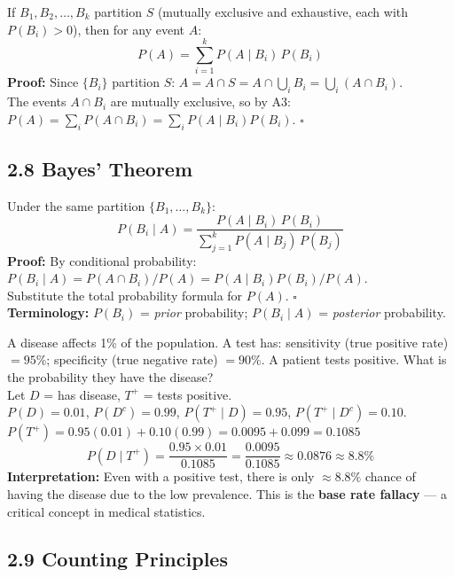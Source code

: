 \documentclass[12pt]{article}
\begin{document}
\begin{thmbox}
If $B_1,B_2,\ldots,B_k$ partition $S$ (mutually exclusive and exhaustive, each with $P(B_i)>0$), then for any event $A$:
\[P(A) = \sum_{i=1}^k P(A\mid B_i)\,P(B_i)\]
\textbf{Proof:} Since $\{B_i\}$ partition $S$: $A=A\cap S=A\cap\bigcup_i B_i=\bigcup_i(A\cap B_i)$.\\
The events $A\cap B_i$ are mutually exclusive, so by A3:
$P(A)=\sum_i P(A\cap B_i)=\sum_i P(A\mid B_i)P(B_i)$. \hfill$\square$
\end{thmbox}

\subsection{2.8 Bayes' Theorem}

\begin{thmbox}
Under the same partition $\{B_1,\ldots,B_k\}$:
\[P(B_i\mid A) = \frac{P(A\mid B_i)\,P(B_i)}{\displaystyle\sum_{j=1}^k P(A\mid B_j)\,P(B_j)}\]
\textbf{Proof:} By conditional probability: $P(B_i\mid A)=P(A\cap B_i)/P(A)=P(A\mid B_i)P(B_i)/P(A)$.\\
Substitute the total probability formula for $P(A)$. \hfill$\square$\\[4pt]
\textbf{Terminology:} $P(B_i)$ = \textit{prior} probability; $P(B_i\mid A)$ = \textit{posterior} probability.
\end{thmbox}

\begin{examplebox}
A disease affects 1\% of the population. A test has: sensitivity (true positive rate) $=95\%$; specificity (true negative rate) $=90\%$. A patient tests positive. What is the probability they have the disease?\\[6pt]
Let $D$ = has disease, $T^+$ = tests positive.\\
$P(D)=0.01$, $P(D^c)=0.99$, $P(T^+\mid D)=0.95$, $P(T^+\mid D^c)=0.10$.\\[4pt]
$P(T^+)=0.95(0.01)+0.10(0.99)=0.0095+0.099=0.1085$
\[P(D\mid T^+)=\frac{0.95\times0.01}{0.1085}=\frac{0.0095}{0.1085}\approx\mathbf{0.0876}\approx8.8\%\]
\textbf{Interpretation:} Even with a positive test, there is only $\approx8.8\%$ chance of having the disease due to the low prevalence. This is the \textbf{base rate fallacy} --- a critical concept in medical statistics.
\end{examplebox}

\subsection{2.9 Counting Principles}
\end{document}
